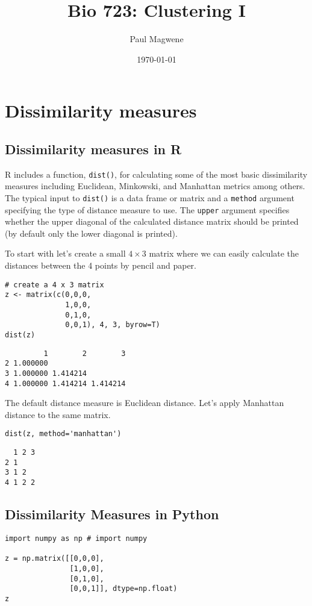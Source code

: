 \documentclass[11pt]{article}
\author{Paul Magwene}
\date{\today}
\title{Bio 723: Clustering I}
\begin{document}
\maketitle
\tableofcontents


\section{Dissimilarity measures}
\label{sec-1}

\subsection{Dissimilarity measures in R}
\label{sec-1-1}

R includes a function, \verb~dist()~, for calculating some of the most basic dissimilarity measures including Euclidean, Minkowski, and Manhattan metrics among others. The typical input to \verb~dist()~ is a data frame or matrix and a \verb~method~ argument specifying the type of distance measure to use. The \verb~upper~ argument specifies whether the upper diagonal of the calculated distance matrix should be printed (by default only the lower diagonal is printed).

To start with let's create a small $4 \times 3$ matrix where we can easily calculate the distances between the 4 points by pencil and paper.

\begin{verbatim}
# create a 4 x 3 matrix
z <- matrix(c(0,0,0,
              1,0,0,
              0,1,0,
              0,0,1), 4, 3, byrow=T)
dist(z)
\end{verbatim}

\begin{verbatim}
         1        2        3
2 1.000000                  
3 1.000000 1.414214         
4 1.000000 1.414214 1.414214
\end{verbatim}

The default distance measure is Euclidean distance.  Let's apply Manhattan distance to the same matrix.

\begin{verbatim}
dist(z, method='manhattan')
\end{verbatim}

\begin{verbatim}
  1 2 3
2 1    
3 1 2  
4 1 2 2
\end{verbatim}

\subsection{Dissimilarity Measures in Python}
\label{sec-1-2}

\begin{verbatim}
import numpy as np # import numpy

z = np.matrix([[0,0,0],
               [1,0,0],
               [0,1,0],
               [0,0,1]], dtype=np.float)
z
\end{verbatim}
\end{document}
